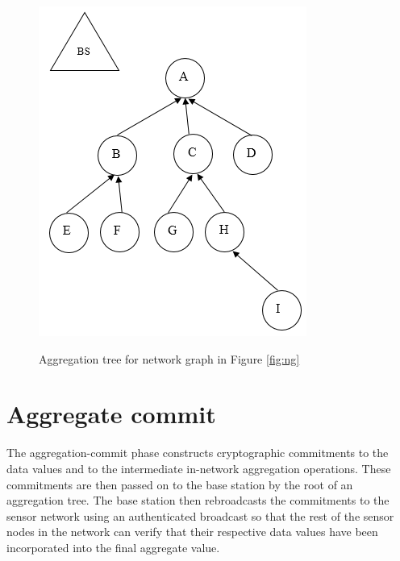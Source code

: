 		\begin{figure}[hp]
			\centering
			\includegraphics[scale = 0.7]{images/aggregation-tree.png}\\
			\caption{Aggregation tree for network graph in Figure \ref{fig:ng}}
			\label{fig:at}
		\end{figure}		

	\section{Aggregate commit} 
		\label{sub:aggregate_commit}
		The aggregation-commit phase constructs cryptographic commitments to the data values and to the intermediate in-network aggregation operations.
		These commitments are then passed on to the base station by the root of an aggregation tree.
		The base station then rebroadcasts the commitments to the sensor network using an authenticated broadcast so that the rest of the sensor nodes in the network can verify that their respective data values have been incorporated into the final aggregate value.

